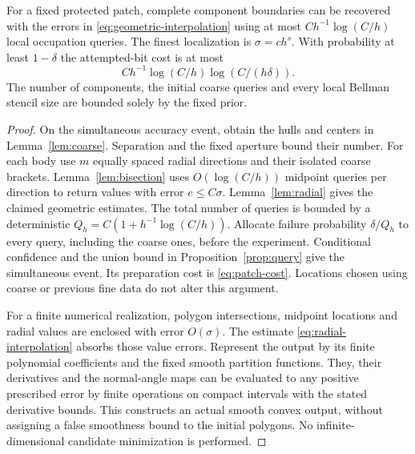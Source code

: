\begin{proposition}\label{prop:patch}
For a fixed protected patch, complete component boundaries can be
recovered with the errors in \eqref{eq:geometric-interpolation} using
at most $C h^{-1}\log(C/h)$ local occupation queries. The finest
localization is $\sigma=c h^s$. With probability at least $1-\delta$
the attempted-bit cost is at most
\begin{equation}\label{eq:patch-cost}
           C h^{-1}\log(C/h)\log(C/(h\delta)).
\end{equation}
The number of components, the initial coarse queries and every
local Bellman stencil size are bounded solely by the fixed prior.
\end{proposition}
\begin{proof}
On the simultaneous accuracy event, obtain the hulls and centers in
Lemma~\ref{lem:coarse}. Separation and the fixed aperture bound their
number. For each body use $m$ equally spaced radial directions and
their isolated coarse brackets. Lemma~\ref{lem:bisection} uses
$O(\log(C/h))$ midpoint queries per direction to return values with
error $e\le C\sigma$. Lemma~\ref{lem:radial} gives the claimed
geometric estimates. The total number of queries is bounded by a
deterministic $Q_h=C(1+h^{-1}\log(C/h))$. Allocate failure probability
$\delta/Q_h$ to every query, including the coarse ones, before the
experiment. Conditional confidence and the union bound in
Proposition~\ref{prop:query} give the simultaneous event. Its
preparation cost is \eqref{eq:patch-cost}. Locations chosen using
coarse or previous fine data do not alter this argument.

For a finite numerical realization, polygon intersections, midpoint
locations and radial values are enclosed with error $O(\sigma)$.
The estimate \eqref{eq:radial-interpolation} absorbs those value errors.
Represent the output by its finite polynomial coefficients and the
fixed smooth partition functions. They, their derivatives and the
normal-angle maps can be evaluated to any positive prescribed error
by finite operations on compact intervals with the stated derivative
bounds. This constructs an actual smooth convex output, without
assigning a false smoothness bound to the initial polygons. No
infinite-dimensional candidate minimization is performed.
\end{proof}
